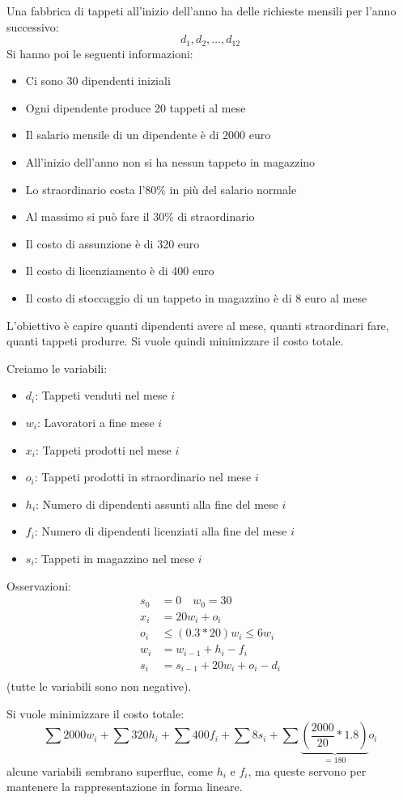 \documentclass[a4paper]{article}
\begin{document}
\begin{example}
  Una fabbrica di tappeti all'inizio dell'anno ha delle richieste mensili per l'anno
  successivo:
  \[
   d_1, d_2, \ldots, d_{12}
  \] 
  Si hanno poi le seguenti informazioni:
  \begin{itemize}
    \item Ci sono 30 dipendenti iniziali
    \item Ogni dipendente produce 20 tappeti al mese
    \item Il salario mensile di un dipendente è di 2000 euro
    \item All'inizio dell'anno non si ha nessun tappeto in magazzino
    \item Lo straordinario costa l'80\% in più del salario normale
    \item Al massimo si può fare il 30\% di straordinario
    \item Il costo di assunzione è di 320 euro
    \item Il costo di licenziamento è di 400 euro
    \item Il costo di stoccaggio di un tappeto in magazzino è di 8 euro al mese
  \end{itemize}
  L'obiettivo è capire quanti dipendenti avere al mese, quanti straordinari fare, quanti
  tappeti produrre. Si vuole quindi minimizzare il costo totale.
  
  Creiamo le variabili:
  \begin{itemize}
    \item \( d_i \): Tappeti venduti nel mese \( i \)
    \item \( w_i \): Lavoratori a fine mese \( i \)
    \item \( x_i \): Tappeti prodotti nel mese \( i \)
    \item \( o_i \): Tappeti prodotti in straordinario nel mese \( i \)
    \item \( h_i \): Numero di dipendenti assunti alla fine del mese \( i \)
    \item \( f_i \): Numero di dipendenti licenziati alla fine del mese \( i \)
    \item \( s_i \): Tappeti in magazzino nel mese \( i \)
  \end{itemize}
  Osservazioni:
  \[
  \begin{aligned}
    s_0 &= 0 \quad w_0 = 30 \\
    x_i &= 20 w_i + o_i \\
    o_i &\le (0.3*20) w_i \le 6 w_i \\
    w_i &= w_{i-1} + h_i - f_i \\
    s_i &= s_{i-1} + 20 w_i + o_i - d_i \\
  \end{aligned}
  \] 
  (tutte le variabili sono non negative).
  
  \vspace{1em}
  \noindent
  Si vuole minimizzare il costo totale:
  \[
    \sum 2000 w_i + \sum 320 h_i + \sum 400 f_i + \sum 8 s_i +
    \sum \underbrace{\left(\frac{2000}{20} * 1.8\right)}_{=180} o_i
  \] 
  alcune variabili sembrano superflue, come \( h_i \) e \( f_i \), ma queste servono
  per mantenere la rappresentazione in forma lineare.
  
\end{example}
\end{document}
